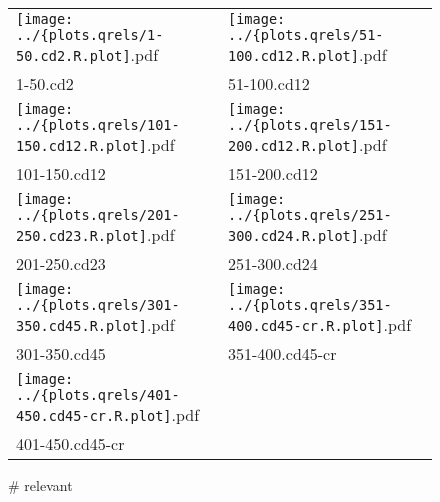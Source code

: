 \documentclass{article}
\begin{document}
\begin{figure}
\begin{tabular}{ll}

  \texttt{[image: ../\{plots.qrels/1-50.cd2.R.plot]}.pdf} &
  \texttt{[image: ../\{plots.qrels/51-100.cd12.R.plot]}.pdf} \\

  1-50.cd2 & 51-100.cd12 \\

  \texttt{[image: ../\{plots.qrels/101-150.cd12.R.plot]}.pdf} &
  \texttt{[image: ../\{plots.qrels/151-200.cd12.R.plot]}.pdf} \\

  101-150.cd12 & 151-200.cd12 \\

  \texttt{[image: ../\{plots.qrels/201-250.cd23.R.plot]}.pdf} &
  \texttt{[image: ../\{plots.qrels/251-300.cd24.R.plot]}.pdf} \\

  201-250.cd23 & 251-300.cd24 \\

  \texttt{[image: ../\{plots.qrels/301-350.cd45.R.plot]}.pdf} &
  \texttt{[image: ../\{plots.qrels/351-400.cd45-cr.R.plot]}.pdf} \\

  301-350.cd45 & 351-400.cd45-cr \\

  \texttt{[image: ../\{plots.qrels/401-450.cd45-cr.R.plot]}.pdf} & \\
  401-450.cd45-cr & \\
\end{tabular}
\caption{\# relevant}
\end{figure}










\end{document}
